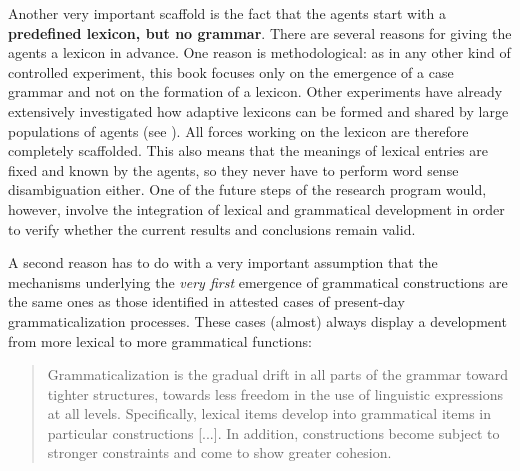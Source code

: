 Another very important scaffold is the fact that the agents start with a {\bfseries predefined lexicon, but no grammar}. There are several reasons for giving the agents a lexicon in advance. One reason is methodological: as in any other kind of controlled experiment, this book focuses only on the emergence of a case grammar and not on the formation of a lexicon. Other experiments have already extensively investigated how adaptive lexicons can be formed and shared by large populations of agents (see ). All forces working on the lexicon are therefore completely scaffolded. This also means that the meanings of lexical entries are fixed and known by the agents, so they never have to perform word sense disambiguation either. One of the future steps of the research program would, however, involve the integration of lexical and grammatical development in order to verify whether the current results and conclusions remain valid.

A second reason has to do with a very important assumption that the mechanisms underlying the {\em very first} emergence of grammatical constructions are the same ones as those identified in attested cases of present-day grammaticalization processes. These cases (almost) always display a development from more lexical to more grammatical functions:

\begin{quote}
Grammaticalization is the gradual drift in all parts of the grammar toward tighter structures, towards less freedom in the use of linguistic expressions at all levels. Specifically, lexical items develop into grammatical items in particular constructions [...]. In addition, constructions become subject to stronger constraints and come to show greater cohesion. \\ \citet[318]{haspelmath98does}
\end{quote}

